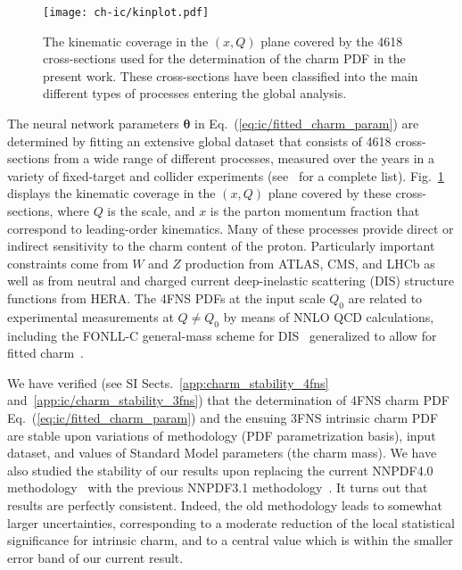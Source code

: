 \begin{figure}[t]
\begin{center}
  \texttt{[image: ch-ic/kinplot.pdf]}
 \end{center}
\vspace{-0.8cm}
\caption{The kinematic coverage in the $(x,Q)$ plane
  covered by the 4618 cross-sections used for the
  determination of the charm PDF in the present work.
  These cross-sections have been classified into the main different
  types of processes entering the global analysis.
  \label{fig:ic/kinplot}
}
\end{figure}

The neural network parameters ${\boldsymbol \theta}$ in
Eq.~(\ref{eq:ic/fitted_charm_param})
are determined by fitting an extensive global dataset that consists of 4618 
cross-sections from a wide range of different processes, measured over
the years in a variety of fixed-target and collider experiments  (see~\cite{Ball:2021leu} for a complete list).
%
Fig.~\ref{fig:ic/kinplot} displays the kinematic coverage in the $(x,Q)$ plane
covered by these cross-sections, where $Q$ is
the  scale, and  $x$ is
the parton momentum fraction that correspond to leading-order kinematics.
%
Many of these processes provide direct or indirect sensitivity 
to the charm content of the proton.
%
Particularly important constraints come from $W$ and $Z$ production from 
ATLAS, CMS, and LHCb as well as from
neutral and charged current deep-inelastic 
scattering (DIS) structure functions from HERA.
%
The 4FNS  PDFs at the input scale $Q_0$ are related
to experimental measurements at $Q \not =Q_0$ by means of NNLO QCD calculations, including
the FONLL-C general-mass scheme for DIS~\cite{Forte:2010ta} generalized to 
allow for fitted charm~\cite{Ball:2015tna}.

We have verified (see
SI Sects.~\ref{app:charm_stability_4fns} and~\ref{app:ic/charm_stability_3fns}) that the
determination of 4FNS charm PDF Eq.~(\ref{eq:ic/fitted_charm_param}) and
the ensuing 3FNS intrinsic charm PDF are  stable upon variations
of methodology (PDF parametrization basis), input dataset, and values
of Standard Model parameters (the charm mass).
We have also studied the stability of our results upon replacing the
current NNPDF4.0 methodology~\cite{Ball:2021leu} with the previous
NNPDF3.1 methodology~\cite{NNPDF:2017mvq}. It turns out that results
are  perfectly consistent. Indeed, the old methodology leads to somewhat larger
uncertainties, corresponding to a moderate reduction of the local statistical
significance for intrinsic charm, and to a central value which is
within the smaller  error band of our current result.


